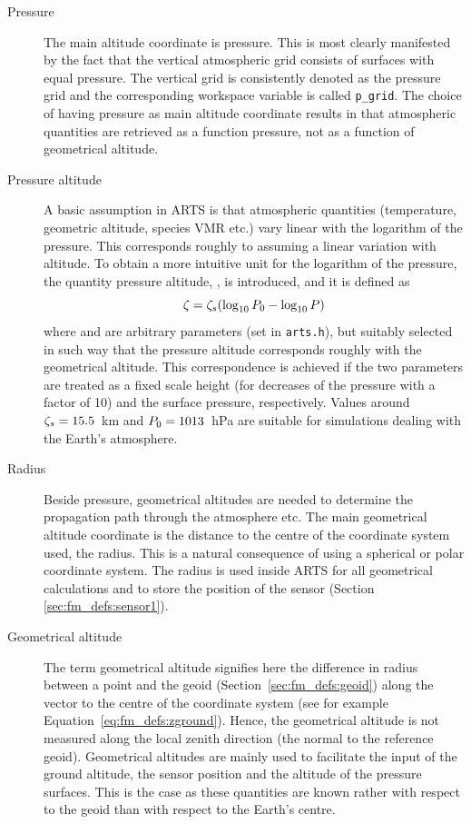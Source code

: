 \begin{description}
  
\item[Pressure] The main altitude coordinate is
  pressure. This is most clearly manifested by the fact that the
  vertical atmospheric grid consists of surfaces with equal pressure.
  The vertical grid is consistently denoted as the pressure grid and
  the corresponding workspace variable is called \verb|p_grid|. The
  choice of having pressure as main altitude coordinate results in
  that atmospheric quantities are retrieved as a function pressure,
  not as a function of geometrical altitude.
  
\item[Pressure altitude] A basic assumption
  in ARTS is that atmospheric quantities (temperature, geometric
  altitude, species VMR etc.) vary linear with the logarithm of the
  pressure. This corresponds roughly to assuming a linear variation
  with altitude. To obtain a more intuitive unit for the logarithm of
  the pressure, the quantity pressure altitude, \PrsAlt, is
  introduced, and it is defined as
  \begin{equation}
   \zeta = \zeta_{s}(\log_{10}P_{0} - \log_{10}P)
   \label{eq:fm_defs:prsalt}
  \end{equation}
  where  and  are arbitrary parameters (set in
  \verb|arts.h|), but suitably selected in such way that the pressure
  altitude corresponds roughly with the geometrical altitude.  This
  correspondence is achieved if the two parameters are treated as a
  fixed scale height (for decreases of the pressure with a factor of
  10) and the surface pressure, respectively. Values around
  $\zeta_{s}=15.5$~km and $P_{0}=1013$~hPa are suitable for
  simulations dealing with the Earth's atmosphere.
  
\item[Radius] Beside pressure, geometrical altitudes are
  needed to determine the propagation path through the atmosphere etc.
  The main geometrical altitude coordinate is the distance to the
  centre of the coordinate system used, the radius. This is a natural
  consequence of using a spherical or polar coordinate system. The
  radius is used inside ARTS for all geometrical calculations and to
  store the position of the sensor (Section~
  \ref{sec:fm_defs:sensor1}).
  
\item[Geometrical altitude] The term
  geometrical altitude signifies here the difference in radius between
  a point and the geoid (Section~\ref{sec:fm_defs:geoid}) along the
  vector to the centre of the coordinate system (see for example
  Equation~\ref{eq:fm_defs:zground}). Hence, the geometrical altitude
  is not measured along the local zenith direction (the normal to the
  reference geoid). Geometrical altitudes are mainly used to
  facilitate the input of the ground altitude, the sensor position and
  the altitude of the pressure surfaces. This is the case as these
  quantities are known rather with respect to the geoid than with
  respect to the Earth's centre.

\end{description}
